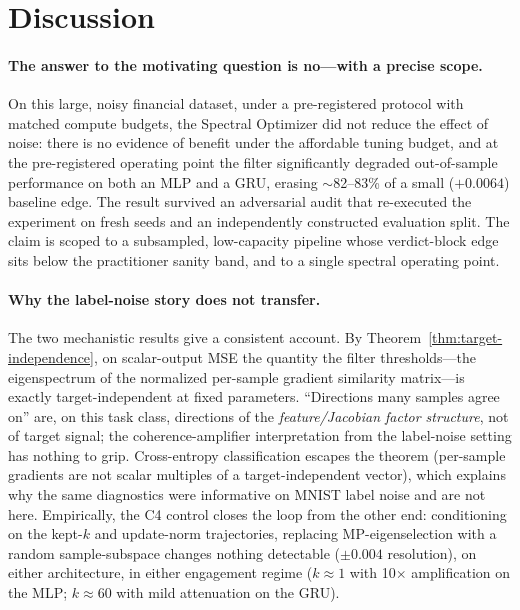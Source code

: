 \section{Discussion}
\label{sec:discussion}

\paragraph{The answer to the motivating question is no---with a precise
scope.} On this large, noisy financial dataset, under a pre-registered
protocol with matched compute budgets, the Spectral Optimizer did not
reduce the effect of noise: there is no evidence of benefit under the
affordable tuning budget, and at the pre-registered operating point the
filter significantly degraded out-of-sample performance on both an MLP and
a GRU, erasing $\sim$82--83\% of a small ($+0.0064$) baseline edge. The
result survived an adversarial audit that re-executed the experiment on
fresh seeds and an independently constructed evaluation split. The claim is
scoped to a subsampled, low-capacity pipeline whose verdict-block edge sits
below the practitioner sanity band, and to a single spectral operating
point.

\paragraph{Why the label-noise story does not transfer.} The two
mechanistic results give a consistent account. By
Theorem~\ref{thm:target-independence}, on scalar-output MSE the quantity
the filter thresholds---the eigenspectrum of the normalized per-sample
gradient similarity matrix---is exactly target-independent at fixed
parameters. ``Directions many samples agree on'' are, on this task class,
directions of the \emph{feature/Jacobian factor structure}, not of target
signal; the coherence-amplifier interpretation from the label-noise setting
has nothing to grip. Cross-entropy classification escapes the theorem
(per-sample gradients are not scalar multiples of a target-independent
vector), which explains why the same diagnostics were informative on MNIST
label noise and are not here. Empirically, the C4 control closes the loop
from the other end: conditioning on the kept-$k$ and update-norm
trajectories, replacing MP-eigenselection with a random sample-subspace
changes nothing detectable ($\pm 0.004$ resolution), on either
architecture, in either engagement regime ($k \approx 1$ with
10$\times$ amplification on the MLP; $k \approx 60$ with mild attenuation
on the GRU).


